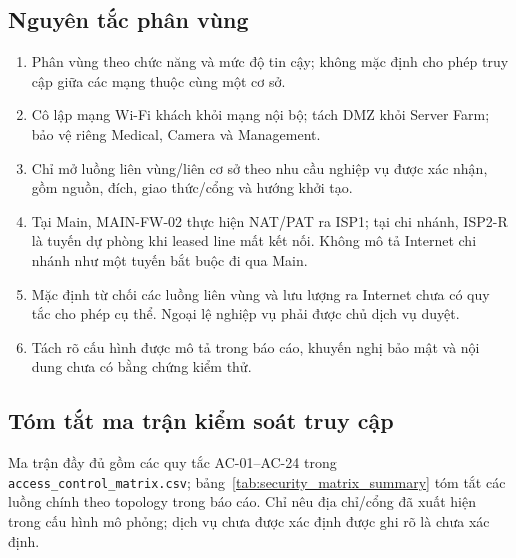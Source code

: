 \subsection{Nguyên tắc phân vùng}
\begin{enumerate}
    \item Phân vùng theo chức năng và mức độ tin cậy; không mặc định cho phép truy cập giữa các mạng thuộc cùng một cơ sở.
    \item Cô lập mạng Wi-Fi khách khỏi mạng nội bộ; tách DMZ khỏi Server Farm; bảo vệ riêng Medical, Camera và Management.
    \item Chỉ mở luồng liên vùng/liên cơ sở theo nhu cầu nghiệp vụ được xác nhận, gồm nguồn, đích, giao thức/cổng và hướng khởi tạo.
    \item Tại Main, MAIN-FW-02 thực hiện NAT/PAT ra ISP1; tại chi nhánh, ISP2-R là tuyến dự phòng khi leased line mất kết nối. Không mô tả Internet chi nhánh như một tuyến bắt buộc đi qua Main.
    \item Mặc định từ chối các luồng liên vùng và lưu lượng ra Internet chưa có quy tắc cho phép cụ thể. Ngoại lệ nghiệp vụ phải được chủ dịch vụ duyệt.
    \item Tách rõ cấu hình được mô tả trong báo cáo, khuyến nghị bảo mật và nội dung chưa có bằng chứng kiểm thử.
\end{enumerate}

\subsection{Tóm tắt ma trận kiểm soát truy cập}
Ma trận đầy đủ gồm các quy tắc AC-01--AC-24 trong \texttt{access\_control\_matrix.csv}; bảng~\ref{tab:security_matrix_summary} tóm tắt các luồng chính theo topology trong báo cáo. Chỉ nêu địa chỉ/cổng đã xuất hiện trong cấu hình mô phỏng; dịch vụ chưa được xác định được ghi rõ là chưa xác định.


